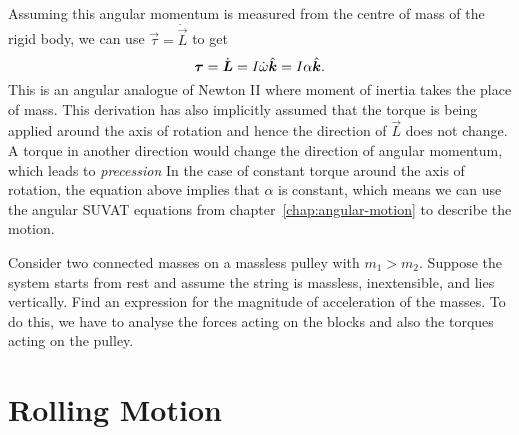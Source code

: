 \documentclass[../classical_mechanics.tex]{subfiles}
\begin{document}
        \paragraph{}
        Assuming this angular momentum is measured from the centre of mass of the rigid body, we can use $\vec{\tau}=\dot{\vec{L}}$ to get
        \begin{equation}
            \boldsymbol{\tau}=\dot{\boldsymbol{L}}=I\dot{\omega}\hat{\boldsymbol{k}}=I\alpha\hat{\boldsymbol{k}}.
        \end{equation}
        This is an angular analogue of Newton II where moment of inertia takes the place of mass.
        This derivation has also implicitly assumed that the torque is being applied around the axis of rotation and hence the direction of $\vec{L}$ does not change.
        A torque in another direction would change the direction of angular momentum, which leads to \textit{precession}
        In the case of constant torque around the axis of rotation, the equation above implies that $\alpha$ is constant, which means we can use the angular SUVAT equations from chapter~\ref{chap:angular-motion} to describe the motion. 
        \begin{example}
            Consider two connected masses on a massless pulley with $m_1>m_2$.
            Suppose the system starts from rest and assume the string is massless, inextensible, and lies vertically.
            Find an expression for the magnitude of acceleration of the masses.
            To do this, we have to analyse the forces acting on the blocks and also the torques acting on the pulley.
        \end{example}


    \section{Rolling Motion}\label{sec:rolling-motion}
\end{document}
